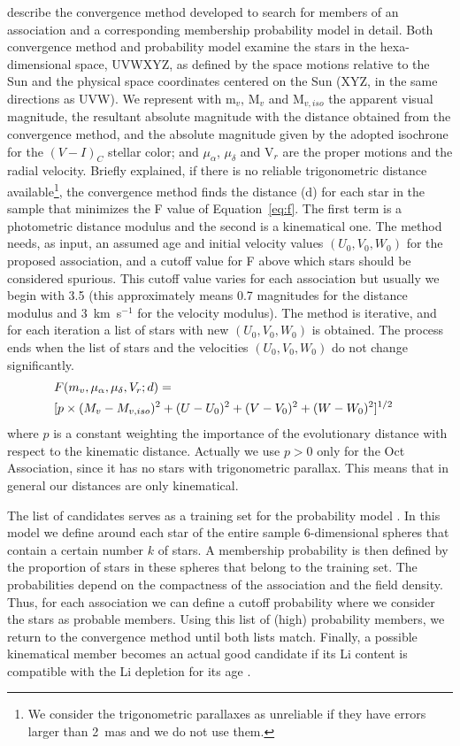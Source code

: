 \documentclass[11pt,twoside]{book}
\begin{document}
\citet{torres06} describe the convergence method developed
to search for members of an association and a corresponding membership probability model in detail.
Both convergence method and probability model examine the stars in the hexa-dimensional space,
UVWXYZ, as defined by the space motions relative to the Sun  and the physical space coordinates centered
on the Sun (XYZ, in the same directions as UVW).
We represent with m$_v$, M$_v$ and M$_{v,iso}$ the apparent visual magnitude,
the resultant absolute magnitude with the distance obtained from the convergence
method,  and the absolute magnitude
given by  the adopted isochrone for the $(V-I)_C$ stellar color;
and   $\mu_\alpha$, $\mu_\delta$ and V$_r$ are the proper motions and the radial velocity.
Briefly explained, if there is no reliable
trigonometric distance available\footnote{We consider the trigonometric
parallaxes as unreliable if they have errors larger than 2~mas and we do not use them.},
the convergence method finds the distance (d) for each star in the sample
that minimizes the F value of Equation~\ref{eq:f}.
The first term is a photometric distance modulus and the second is a kinematical one.
The method needs, as input, an assumed age and initial velocity values $(U_0,
V_0, W_0)$ for the proposed association,
and a cutoff value for F above which stars should be considered spurious.
This cutoff value varies for each association but usually we begin with 3.5
(this approximately means 0.7 magnitudes
for the distance modulus and 3~km~s$^{-1}$ for the velocity modulus).
The method is iterative, and for each iteration a list of stars with new  $(U_0, V_0, W_0)$ is obtained.
The process ends when the list of stars and the velocities $(U_0, V_0, W_0)$ do
not change significantly.
\begin{eqnarray}
\label{eq:f}
\nonumber \lefteqn{F(m_v,\mu_\alpha,\mu_\delta,V_r;d) =}\\
&[p\times(M_v-M_{v,iso})^2+(U-U_0)^2+(V-V_0)^2+(W-W_0)^2]^{1/2}
\end{eqnarray}
where $p$ is a constant weighting the importance of the evolutionary
distance with respect to the kinematic distance.
Actually we use $p>0$ only for the Oct Association, since it has no stars
with trigonometric parallax. This means that in general our distances are only
kinematical.

The  list of candidates serves as a training set for the probability model
\cite[k--NN model,][]{Sterzik95}.
In this model we define around each star of the entire sample 6-dimensional
spheres that contain a certain number $k$ of stars.
A membership probability is then defined
by the proportion of stars in these spheres that belong to the training set.
The probabilities depend on the compactness of the association and the field density.
Thus, for each association we can define a cutoff probability
where we consider the stars as  probable members.
Using this list of (high) probability members, we return to the convergence
method until both lists match.
Finally, a possible kinematical member becomes an actual good candidate if its
Li content is compatible with the Li depletion for its age \citep{neu97}.
\end{document}
